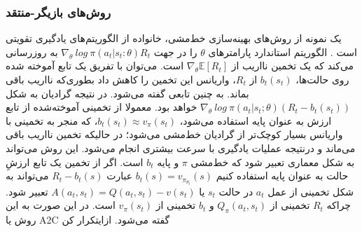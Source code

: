 \subsubsection{روش‌های بازیگر-منتقد}
یک نمونه از روش‌های بهینه‌سازی خط‌مشی، خانواده
 از الگوریتم‌های یادگیری تقویتی است
\cite{williams1992simple}.
الگوریتم استاندارد  پارامترهای $\theta$ را در جهت 
 $\nabla_\theta \  log  \ \pi (a_t|s_t:\theta)R_t$ به روزرسانی می‌کند که یک تخمین نااریب از
   $\nabla_\theta \mathbb{E}[R_t]$
است. می‌توان  با تفریق یک تابع آموخته شده روی حالت‌ها، 
$b_t(s_t)$
از 
$R_t$، واریانس این تخمین را کاهش داد بطوری‌که نااریب باقی بماند. به چنین تابعی  گفته می‌شود. در نتیجه گرادیان به شکل
$\nabla_\theta \ log \ \pi(a_t|s_t;\theta) (R_t - b_t(s_t))$
خواهد بود. معمولا از تخمینی آموخته‌شده از تابع ارزش به عنوان پایه استفاده می‌شود،
$b_t(s_t) \approx v_\pi (s_t)$،
 که منجر به تخمینی با واریانس بسیار کوچک‌تر از گرادیان خط‌مشی می‌\nf شود؛ در حالیکه تخمین نااریب باقی می‌ماند و درنتیجه عملیات یادگیری با سرعت بیشتری انجام می‌شود.
این روش می‌تواند به شکل معماری   تعبیر شود که خط‌مشی $\pi$  و پایه $b_t$  است. اگر از تخمین یک تابع ارزشِ حالت به عنوان پایه استفاده کنیم 
$b_t(s) = v_{\pi_{\theta_t}}(s)$ عبارت $R_t - b_t(s)$ می‌تواند به شکل تخمینی از   عمل $a_t$ در حالت $s_t$ یا 
$A(a_t,s_t)=Q(a_t,s_t)-v(s_t)$ تعبیر شود. چراکه $R_t$ تخمینی از  $Q_\pi (a_t, s_t)$ و $b_t$ تخمینی از  $v_\pi (s_t)$ است. در این صورت به این روش 
 یا A2C گفته می‌شود.
‌ازای{تکرار کن}



